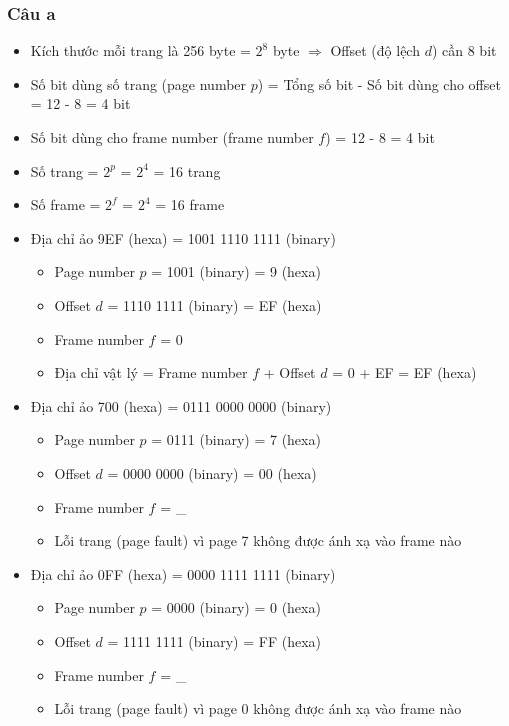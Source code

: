 \documentclass[12pt, letterpaper]{article}
\begin{document}
\subsubsection{Câu a}
\begin{itemize}
    \item Kích thước mỗi trang là 256 byte = $2^8$ byte $\Rightarrow$ Offset (độ lệch $d$) cần 8 bit
    \item Số bit dùng số trang (page number $p$) = Tổng số bit - Số bit dùng cho offset = 12 - 8 = 4 bit
    \item Số bit dùng cho frame number (frame number $f$) = 12 - 8 = 4 bit
    \item Số trang = $2^p$ = $2^4$ = 16 trang
    \item Số frame = $2^f$ = $2^4$ = 16 frame
    \item Địa chỉ ảo 9EF (hexa) = 1001 1110 1111 (binary)
    \begin{itemize}
        \item Page number $p$ = 1001 (binary) = 9 (hexa)
        \item Offset $d$ = 1110 1111 (binary) = EF (hexa)
        \item Frame number $f$ = 0
        \item Địa chỉ vật lý = Frame number $f$ + Offset $d$ = 0 + EF = EF (hexa)
    \end{itemize}
    \item Địa chỉ ảo 700 (hexa) = 0111 0000 0000 (binary)
    \begin{itemize}
        \item Page number $p$ = 0111 (binary) = 7 (hexa)
        \item Offset $d$ = 0000 0000 (binary) = 00 (hexa)
        \item Frame number $f$ = \_
        \item Lỗi trang (page fault) vì page 7 không được ánh xạ vào frame nào
    \end{itemize}
    \item Địa chỉ ảo 0FF (hexa) = 0000 1111 1111 (binary)
    \begin{itemize}
        \item Page number $p$ = 0000 (binary) = 0 (hexa)
        \item Offset $d$ = 1111 1111 (binary) = FF (hexa)
        \item Frame number $f$ = \_
        \item Lỗi trang (page fault) vì page 0 không được ánh xạ vào frame nào
    \end{itemize}
\end{itemize}
\end{document}
